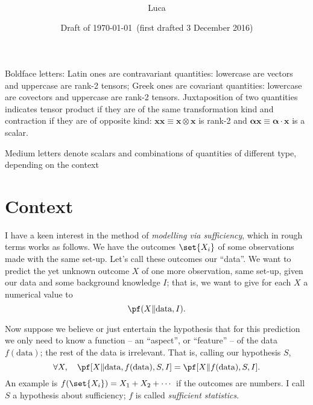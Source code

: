 \documentclass[10pt,%
onecolumn,oneside,a5paper,article,frenchb,italian,german,swedish,latin,british%
]{memoir}
\title{\pdftitle%
}
\author{\ifnotnotes%
{\firstname{P.G.L.}\ \surname{Porta\,Mana}}%
\\[2\jot]%
\affiliation{INM-6, Forschungszentrum Jülich, Germany}
\else Luca\fi
\quad
\epost{\email{pglpm0}{gmail.com}}%
}
\date{Draft of \mydate\today\ (first drafted 3 December 2016)}
\newif\ifnotnotes
\newcommand*{\te}{}
\newcommand*{\co}{}
\newcommand*{\yxn}{X}
\newcommand*{\yI}{I}
\newcommand*{\yS}{S}
\newcommand*{\data}{\textrm{data}}
\newcommand*{\yf}{f}
\newcommand*{\bx}{\bm{x}}
\begin{document}
\captiondelim{\quad}\captionnamefont{\footnotesize}\captiontitlefont{\footnotesize}
\frenchspacing

\maketitle
\ifnotnotes\myabstract
\begin{abstract}\labelsep 0pt%
\noindent ***
\par%
\noindent\pacs{***}\qquad\msc{***}
\end{abstract}\fi

\frenchspacing


Boldface letters: Latin ones are contravariant quantities: lowercase
are vectors and uppercase are rank-2 tensors; Greek ones are covariant
quantities: lowercase are covectors and uppercase are rank-2 tensors.
Juxtaposition of two quantities indicates tensor product if they are of the same
transformation kind and contraction if they are of opposite kind:
$\bx\te\bx\equiv\bx\otimes\bx$ is rank-2 and
$\bm{\alpha}\co\bx\equiv\bm{\alpha}\cdot\bx$ is a scalar. \iffalse Full contraction
is indicated by a colon: $\bm{\varGamma}\con\bm{G}$ is a scalar.\fi

Medium letters denote scalars and combinations of quantities of different
type, depending on the context


\section{Context}
\label{sec:context}

I have a keen interest in the method of \emph{modelling via sufficiency},
which in rough terms works as follows. We have the outcomes $\set{X_i}$
of some observations made with the same set-up. Let's call these outcomes
our \enquote{data}. We want to predict the yet unknown outcome $\yxn$ of one
more observation, same set-up, given our data and some background knowledge
$\yI$; that is, we want to give for each $\yxn$ a numerical value to
\begin{equation}
  \label{eq:P_new_outcome}
  \pf(\yxn \| \data, \yI).
\end{equation}

Now suppose we believe or just entertain the hypothesis that for this
prediction we only need to know a function -- an \enquote{aspect}, or
\enquote{feature} -- of the data $\yf(\data)$; the rest of the data is
irrelevant. That is, calling our hypothesis $\yS$,
\begin{equation}
  \label{eq:P_new_outcome_sufficiency}
\forall\yxn,\quad  \pf[\yxn \| \data, \yf(\data), \yS, \yI] =
  \pf[\yxn \| \yf(\data), \yS, \yI].
\end{equation}
An example is $\yf(\set{X_i})=X_1+X_2+\dotsb$ if the outcomes are numbers.
I call $\yS$ a hypothesis about sufficiency; $\yf$ is called
\emph{sufficient statistics}.
\end{document}
